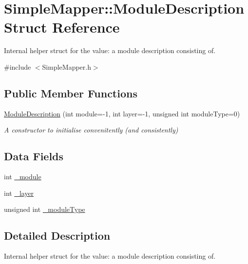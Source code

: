 \hypertarget{struct_simple_mapper_1_1_module_description}{\section{Simple\-Mapper\-:\-:Module\-Description Struct Reference}
\label{struct_simple_mapper_1_1_module_description}
}


Internal helper struct for the value\-: a module description consisting of.  




{\ttfamily \#include $<$Simple\-Mapper.\-h$>$}

\subsection*{Public Member Functions}
\begin{DoxyCompactItemize}
\item 
\hyperlink{struct_simple_mapper_1_1_module_description_a647d050d5ce3bace60cb1f9905b084af}{Module\-Description} (int module=-\/1, int layer=-\/1, unsigned int module\-Type=0)
\begin{DoxyCompactList}\small\item\em A constructor to initialise convenitently (and consistently) \end{DoxyCompactList}\end{DoxyCompactItemize}
\subsection*{Data Fields}
\begin{DoxyCompactItemize}
\item 
int \hyperlink{struct_simple_mapper_1_1_module_description_a911114d3bb45d3b400e62889725e2480}{\-\_\-module}
\item 
int \hyperlink{struct_simple_mapper_1_1_module_description_a6fce11791e489f397fa62f15bf2034d5}{\-\_\-layer}
\item 
unsigned int \hyperlink{struct_simple_mapper_1_1_module_description_afcf7709bc493381c3fbd78925fe07a46}{\-\_\-module\-Type}
\end{DoxyCompactItemize}


\subsection{Detailed Description}
Internal helper struct for the value\-: a module description consisting of. 

